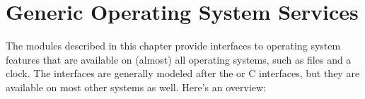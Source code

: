 \chapter{Generic Operating System Services \label{allos}}

The modules described in this chapter provide interfaces to operating
system features that are available on (almost) all operating systems,
such as files and a clock.  The interfaces are generally modeled
after the \UNIX{} or C interfaces, but they are available on most
other systems as well.  Here's an overview:

\localmoduletable
